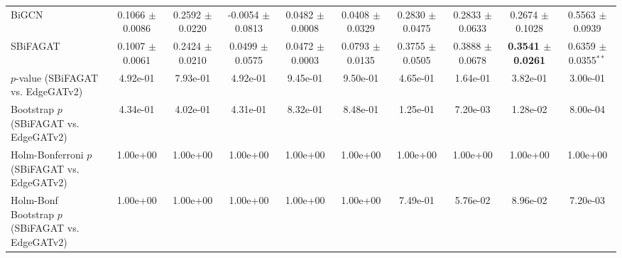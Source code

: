 \begin{table}[t]
{\begin{tabular}{lccccccccc}
BiGCN & 0.1066 $\pm$ 0.0086 & 0.2592 $\pm$ 0.0220 & -0.0054 $\pm$ 0.0813 & 0.0482 $\pm$ 0.0008 & 0.0408 $\pm$ 0.0329 & 0.2830 $\pm$ 0.0475 & 0.2833 $\pm$ 0.0633 & 0.2674 $\pm$ 0.1028 & 0.5563 $\pm$ 0.0939 \\
SBiFAGAT & 0.1007 $\pm$ 0.0061 & 0.2424 $\pm$ 0.0210 & 0.0499 $\pm$ 0.0575 & 0.0472 $\pm$ 0.0003 & 0.0793 $\pm$ 0.0135 & 0.3755 $\pm$ 0.0505 & 0.3888 $\pm$ 0.0678 & \textbf{0.3541 $\pm$ 0.0261} & 0.6359 $\pm$ 0.0355$^{**}$ \\
\midrule
$p$-value (SBiFAGAT vs. EdgeGATv2) & 4.92e-01 & 7.93e-01 & 4.92e-01 & 9.45e-01 & 9.50e-01 & 4.65e-01 & 1.64e-01 & 3.82e-01 & 3.00e-01 \\
Bootstrap $p$ (SBiFAGAT vs. EdgeGATv2) & 4.34e-01 & 4.02e-01 & 4.31e-01 & 8.32e-01 & 8.48e-01 & 1.25e-01 & 7.20e-03 & 1.28e-02 & 8.00e-04 \\
Holm-Bonferroni $p$ (SBiFAGAT vs. EdgeGATv2) & 1.00e+00 & 1.00e+00 & 1.00e+00 & 1.00e+00 & 1.00e+00 & 1.00e+00 & 1.00e+00 & 1.00e+00 & 1.00e+00 \\
Holm-Bonf Bootstrap $p$ (SBiFAGAT vs. EdgeGATv2) & 1.00e+00 & 1.00e+00 & 1.00e+00 & 1.00e+00 & 1.00e+00 & 7.49e-01 & 5.76e-02 & 8.96e-02 & 7.20e-03 \\
\bottomrule
\end{tabular}
}
\end{table}
